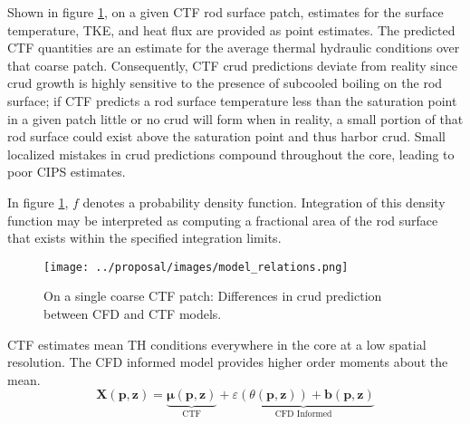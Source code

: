 Shown in figure \ref{fig:model_overview}, on a given CTF rod surface patch, estimates for the surface temperature, TKE, and heat flux are provided as point estimates.  The predicted CTF quantities are an estimate for the average thermal hydraulic conditions over that coarse patch.   Consequently, CTF crud predictions deviate from reality since crud growth is highly sensitive to the presence of subcooled boiling on the rod surface; if CTF predicts a rod surface temperature less than the saturation point in a given patch little or no crud will form when in reality, a small portion of that rod surface could exist above the saturation point and thus harbor crud.  Small localized mistakes in crud predictions compound throughout the core, leading to poor CIPS estimates.

In figure \ref{fig:model_overview}, $f$ denotes a probability density function.  Integration of this density function may be interpreted as computing a fractional area of the rod surface that exists within the specified integration limits.
\begin{figure}[!htbp]
    \centering
    \texttt{[image: ../proposal/images/model\_relations.png]}
    \caption{On a single coarse CTF patch: Differences in crud prediction between CFD and CTF models.}
    \label{fig:model_overview}
\end{figure}

CTF estimates mean TH conditions everywhere in the core at a low spatial resolution.  The CFD informed model provides higher order moments about the mean.
\begin{equation}
   \mathbf X(\mathbf p, \mathbf z) = \underbrace{ \bm \mu(\mathbf p, \mathbf{z})}_\text{CTF} +
   \underbrace{\varepsilon({\theta (\bm p, \mathbf z)}) + \bm b(\mathbf p, \mathbf{z})}_\text{CFD Informed}
   \label{eq:hi2lo_overview}
\end{equation}

